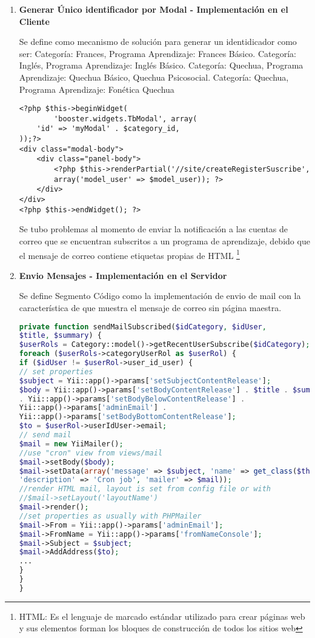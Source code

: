 \begin{enumerate}

\item \textbf{Generar \'{U}nico identificador por Modal - Implementaci\'{o}n en
el Cliente}

Se define como mecanismo de soluci\'{o}n para generar un identidicador como ser:
Categor\'{i}a: Frances, Programa Aprendizaje: Frances B\'{a}sico. Categor\'{i}a:
Ingl\'{e}s, Programa Aprendizaje: Ingl\'{e}s B\'{a}sico. Categor\'{i}a: Quechua,
Programa Aprendizaje: Quechua B\'{a}sico, Quechua Psicosocial. Categor\'{i}a: Quechua,
Programa Aprendizaje: Fon\'{e}tica Quechua

\begin{lstlisting}[]
<?php $this->beginWidget(
        'booster.widgets.TbModal', array(
    'id' => 'myModal' . $category_id,
));?>
<div class="modal-body">
    <div class="panel-body">
        <?php $this->renderPartial('//site/createRegisterSuscribe', 
        array('model_user' => $model_user)); ?>
    </div>
</div>
<?php $this->endWidget(); ?>
\end{lstlisting}

Se tubo problemas al momento de enviar la notificaci\'{o}n a las cuentas de correo
que se encuentran subscritos a un programa de aprendizaje, debido que el mensaje de 
correo contiene etiquetas propias de HTML \footnote{HTML: Es el lenguaje de marcado
est\'{a}ndar utilizado para crear p\'{a}ginas web y sus elementos forman los bloques
de construcci\'{o}n de todos los sitios web}

\item \textbf{Envio Mensajes - Implementaci\'{o}n en el Servidor}

Se define Segmento C\'{o}digo como la implementaci\'{o}n de envio de mail con la 
caracter\'{i}stica de que muestra el mensaje de correo sin p\'{a}gina maestra.

\begin{lstlisting}[language = PHP]
private function sendMailSubscribed($idCategory, $idUser,
$title, $summary) {
$userRols = Category::model()->getRecentUserSubscribe($idCategory);
foreach ($userRols->categoryUserRol as $userRol) {
if ($idUser != $userRol->user_id_user) {
// set properties
$subject = Yii::app()->params['setSubjectContentRelease'];
$body = Yii::app()->params['setBodyContentRelease'] . $title . $summary
. Yii::app()->params['setBodyBelowContentRelease'] . 
Yii::app()->params['adminEmail'] . 
Yii::app()->params['setBodyBottomContentRelease'];
$to = $userRol->userIdUser->email;
// send mail
$mail = new YiiMailer();
//use "cron" view from views/mail
$mail->setBody($body);
$mail->setData(array('message' => $subject, 'name' => get_class($this),
'description' => 'Cron job', 'mailer' => $mail));
//render HTML mail, layout is set from config file or with 
//$mail->setLayout('layoutName')
$mail->render();
//set properties as usually with PHPMailer
$mail->From = Yii::app()->params['adminEmail'];
$mail->FromName = Yii::app()->params['fromNameConsole'];
$mail->Subject = $subject;
$mail->AddAddress($to);
...
}
}
}
\end{lstlisting}

\end{enumerate}

